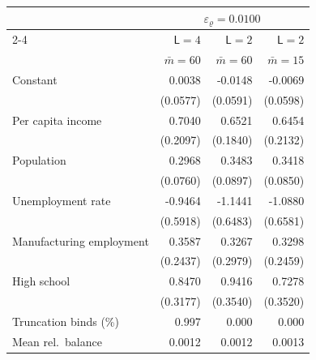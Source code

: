 \begin{tabular}{lrrr}
\toprule
 & \multicolumn{3}{c}{$\varepsilon_\varrho = 0.0100$} \\
\cmidrule(lr){2-4}
 & $\mathsf L = 4$ & $\mathsf L = 2$ & $\mathsf L = 2$ \\
 & $\bar m = 60$ & $\bar m = 60$ & $\bar m = 15$ \\
\midrule
Constant & 0.0038 & -0.0148 & -0.0069 \\
 & (0.0577) & (0.0591) & (0.0598) \\
Per capita income & 0.7040 & 0.6521 & 0.6454 \\
 & (0.2097) & (0.1840) & (0.2132) \\
Population & 0.2968 & 0.3483 & 0.3418 \\
 & (0.0760) & (0.0897) & (0.0850) \\
Unemployment rate & -0.9464 & -1.1441 & -1.0880 \\
 & (0.5918) & (0.6483) & (0.6581) \\
Manufacturing employment & 0.3587 & 0.3267 & 0.3298 \\
 & (0.2437) & (0.2979) & (0.2459) \\
High school & 0.8470 & 0.9416 & 0.7278 \\
 & (0.3177) & (0.3540) & (0.3520) \\
\midrule
Truncation binds (\%) & 0.997 & 0.000 & 0.000 \\
Mean rel.\ balance & 0.0012 & 0.0012 & 0.0013 \\
\bottomrule
\end{tabular}
